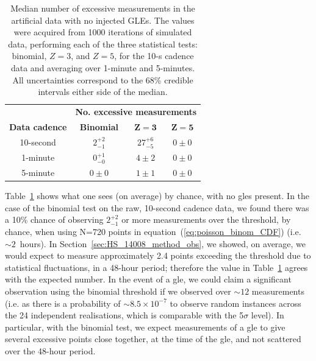 \begin{table}[ht!]
	\begin{center}
		\caption{Median number of excessive measurements in the artificial data with no injected GLEs. The values were acquired from 1000 iterations of simulated data, performing each of the three statistical tests: binomial, $Z=3$, and $Z=5$, for the 10-s cadence data and averaging over 1-minute and 5-minutes. All uncertainties correspond to the 68\% credible intervals either side of the median.}
		\label{tab:HS_14008_sims_zeros}
		\begin{tabular}{c c c c}
			\hline 
			{} & \multicolumn{3}{c}{\bf No. excessive measurements} \\ 
			{\bf Data cadence} & {\bf Binomial} & {\bf $\mathbf{Z=3}$} & {\bf $\mathbf{Z=5}$}  \\ 
			\hline 
			10-second & $2^{+2}_{-1}$ & $27^{+6}_{-5}$ & $0 \pm 0$ \\ 
			1-minute & $0^{+1}_{-0}$ & $4 \pm 2$ & $0 \pm 0$ \\ 
			5-minute & $0 \pm 0$ & $1 \pm 1$ & $0 \pm 0$ \\ 
			\hline 
		\end{tabular} 
	\end{center}
\end{table}
%
%
\vspace{1em}

Table~\ref{tab:HS_14008_sims_zeros} shows what one sees (on average) by chance, with no \glspl{gle} present. In the case of the binomial test on the raw, 10-second cadence data, we found there was a 10\% chance of observing $2^{+2}_{-1}$ or more measurements over the threshold, by chance, when using N=720 points in equation~(\ref{eq:poisson_binom_CDF}) (i.e. $\sim2$~hours). In Section~\ref{sec:HS_14008_method_obs}, we showed, on average, we would expect to measure approximately 2.4 points exceeding the threshold due to statistical fluctuations, in a 48-hour period; therefore the value in Table~\ref{tab:HS_14008_sims_zeros} agrees with the expected number. In the event of a \gls{gle}, we could claim a significant observation using the binomial threshold if we observed over $\sim12$ measurements (i.e. as there is a probability of $\sim8.5\times10^{-7}$ to observe random instances across the 24 independent realisations, which is comparable with the 5$\sigma$ level). In particular, with the binomial test, we expect measurements of a \gls{gle} to give several excessive points close together, at the time of the \gls{gle}, and not scattered over the 48-hour period. %

